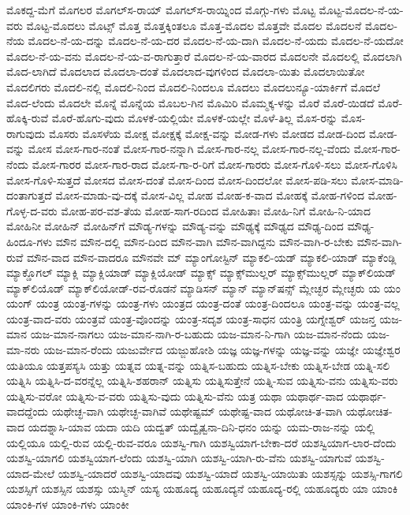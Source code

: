 {ಮೊಕದ್ದ-ಮೆಗೆ
ಮೊಗಲರ
ಮೊಗಲ್‌ಸ-ರಾಯ್
ಮೊಗಲ್‌ಸ-ರಾಯ್ನಿಂದ
ಮೊಗ್ಗು-ಗಳು
ಮೊಟ್ಟ
ಮೊಟ್ಟ-ಮೊದಲ-ನೆ-ಯ-ವರು
ಮೊಟ್ಟ-ಮೊದಲು
ಮೊಟ್ಸ್
ಮೊತ್ತ
ಮೊತ್ತಕ್ಕಿಂತಲೂ
ಮೊತ್ತ-ಮೊದಲ
ಮೊತ್ತವೇ
ಮೊದಲ
ಮೊದಲನೆ
ಮೊದಲ-ನೆಯ
ಮೊದಲ-ನೆ-ಯ-ದನ್ನು
ಮೊದಲ-ನೆ-ಯ-ದರ
ಮೊದಲ-ನೆ-ಯ-ದಾಗಿ
ಮೊದಲ-ನೆ-ಯದು
ಮೊದಲ-ನೆ-ಯದೋ
ಮೊದಲ-ನೆ-ಯ-ವನು
ಮೊದಲ-ನೆ-ಯ-ವ-ರಾಗುತ್ತಾರೆ
ಮೊದಲ-ನೆ-ಯ-ವಾರದ
ಮೊದಲನೇ
ಮೊದಲಲ್ಲಿ
ಮೊದಲಾಗಿ
ಮೊದ-ಲಾಗಿದೆ
ಮೊದಲಾದ
ಮೊದಲಾ-ದಂತೆ
ಮೊದಲಾದ-ವುಗಳಿಂದ
ಮೊದಲಾ-ಯಿತು
ಮೊದಲಾಯಿತೋ
ಮೊದಲಿಗರು
ಮೊದಲಿ-ನಲ್ಲಿ
ಮೊದಲಿ-ನಿಂದ
ಮೊದಲಿ-ನಿಂದಲೂ
ಮೊದಲು
ಮೊದಲುನ್ಯೂ-ಯಾರ್ಕಿಗೆ
ಮೊದಲೆ
ಮೊದ-ಲೆಂದು
ಮೊದಲೇ
ಮೊನ್ನೆ
ಮೊನ್ನೆಯ
ಮೊಬಲ-ಗಿನ
ಮೊಮಿರಿ
ಮೊಮ್ಮಕ್ಕ-ಳನ್ನು
ಮೊರೆ
ಮೊರೆ-ಯಿಡದೆ
ಮೊರೆ-ಹೊಕ್ಕಿ-ರುವೆ
ಮೊರೆ-ಹೊಗು-ವುದು
ಮೊಳಕೆ-ಯಲ್ಲಿಯೇ
ಮೊಳಕೆ-ಯಲ್ಲೇ
ಮೊಳೆ-ತಿಲ್ಲ
ಮೊಸ-ರನ್ನು
ಮೊಸ-ರಾಗುವುದು
ಮೊಸರು
ಮೊಸಳೆಯ
ಮೋಕ್ಷ
ಮೋಕ್ಷಕ್ಕೆ
ಮೋಕ್ಷ-ವನ್ನು
ಮೋಡ-ಗಳು
ಮೋಡದ
ಮೋಡ-ದಿಂದ
ಮೋಡ-ವನ್ನು
ಮೋಸ
ಮೋಸ-ಗಾರ-ನಂತೆ
ಮೋಸ-ಗಾರ-ನನ್ನಾಗಿ
ಮೋಸ-ಗಾರ-ನಲ್ಲ
ಮೋಸ-ಗಾರ-ನಲ್ಲ-ವೆಂದು
ಮೋಸ-ಗಾರ-ನೆಂದು
ಮೋಸ-ಗಾರರ
ಮೋಸ-ಗಾರ-ರಾದ
ಮೋಸ-ಗಾ-ರ-ರಿಗೆ
ಮೋಸ-ಗಾರರು
ಮೋಸ-ಗೊಳಿ-ಸಲು
ಮೋಸ-ಗೊಳಿಸಿ
ಮೋಸ-ಗೊಳಿ-ಸುತ್ತದೆ
ಮೋಸದ
ಮೋಸ-ದಂತೆ
ಮೋಸ-ದಿಂದ
ಮೋಸ-ದಿಂದಲೋ
ಮೋಸ-ಪಡಿ-ಸಲು
ಮೋಸ-ಮಾಡಿ-ದಂತಾಗುತ್ತದೆ
ಮೋಸ-ಮಾಡು-ವು-ದಕ್ಕೆ
ಮೋಸ-ವಿಲ್ಲ
ಮೋಹ
ಮೋಹ-ಕ-ವಾದ
ಮೋಹಕ್ಕೆ
ಮೋಹ-ಗಳಿಂದ
ಮೋಹ-ಗೊಳ್ಳ-ದ-ವರು
ಮೋಹ-ಪರ-ವಶ-ತೆಯ
ಮೋಹ-ಸಾಗ-ರದಿಂದ
ಮೋಹಿತಾಃ
ಮೋಹಿ-ನಿಗೆ
ಮೋಹಿ-ನಿ-ಯಾದ
ಮೋಹಿನೀ
ಮೋಹಿನ್
ಮೋಹಿನ್‌ಗೆ
ಮೌಡ್ಯ-ಗಳನ್ನು
ಮೌಡ್ಯ-ವನ್ನು
ಮೌಢ್ಯಕ್ಕೆ
ಮೌಢ್ಯದ
ಮೌಢ್ಯ-ದಿಂದ
ಮೌಢ್ಯ-ಹಿಂದೂ-ಗಳು
ಮೌನ
ಮೌನ-ದಲ್ಲಿ
ಮೌನ-ದಿಂದ
ಮೌನ-ವಾಗಿ
ಮೌನ-ವಾಗಿದ್ದನು
ಮೌನ-ವಾಗಿ-ರ-ಬೇಕು
ಮೌನ-ವಾಗಿ-ರುವೆ
ಮೌನ-ವಾದ
ಮೌನ-ವಾದರೂ
ಮೌನವೇ
ಮ್
ಮ್ಯಾಂಗೋಸ್ಟಿನ್
ಮ್ಯಾಕಲಿ-ಯಡ್
ಮ್ಯಾಕಲಿ-ಯಾಡ್
ಮ್ಯಾಕೆಂಡ್ಲಿ
ಮ್ಯಾಕ್ಡೊಗಲ್
ಮ್ಯಾಕ್ಲಿ
ಮ್ಯಾಕ್ಲಿಯಾಡ್
ಮ್ಯಾಕ್ಲಿಯೋಡ್
ಮ್ಯಾಕ್ಸ್
ಮ್ಯಾಕ್ಸ್‌ಮುಲ್ಲರ್
ಮ್ಯಾಕ್ಸ್‌ಮುಲ್ಲರ್‌
ಮ್ಯಾಕ್‌ಲಿಯಡ್
ಮ್ಯಾಕ್‌ಲಿಯೊಡ್
ಮ್ಯಾಕ್‌ಲಿಯೋಡ್‌-ರವ-ರೊಡನೆ
ಮ್ಯಾಡಿಸನ್
ಮ್ಯಾನ್
ಮ್ಯಾನ್‌ಷನ್ಸ್
ಮ್ಲೇಚ್ಛರ
ಮ್ಲೇಚ್ಛರು
ಯ
ಯಂ
ಯಂಗ್
ಯಂತ್ರ
ಯಂತ್ರ-ಗಳನ್ನು
ಯಂತ್ರ-ಗಳು
ಯಂತ್ರದ
ಯಂತ್ರ-ದಂತೆ
ಯಂತ್ರ-ದಿಂದಲೂ
ಯಂತ್ರ-ವನ್ನು
ಯಂತ್ರ-ವಲ್ಲ
ಯಂತ್ರ-ವಾದ-ವರು
ಯಂತ್ರವೆ
ಯಂತ್ರ-ವೊಂದನ್ನು
ಯಂತ್ರ-ಸದೃಶ
ಯಂತ್ರ-ಸಾಧನ
ಯಂತ್ರಿ
ಯಗ್ನೇಶ್ವರ್
ಯಜನ್ತ
ಯಜ-ಮಾನ
ಯಜ-ಮಾನ-ನಾಗಲು
ಯಜ-ಮಾನ-ನಾಗಿ-ರ-ಬಹುದು
ಯಜ-ಮಾನ-ನಿ-ಗಾಗಿ
ಯಜ-ಮಾನ-ನೆಂದು
ಯಜ-ಮಾ-ನರು
ಯಜ-ಮಾನ-ರೆಂದು
ಯಜುರ್ವೇದ
ಯಜ್ಜುಹೋಶಿ
ಯಜ್ಞ
ಯಜ್ಞ-ಗಳನ್ನು
ಯಜ್ಞ-ವನ್ನು
ಯಜ್ಞೇ
ಯಜ್ಞೇಶ್ವರ
ಯತಿಯೂ
ಯತ್ತಪಸ್ಯಸಿ
ಯತ್ತು
ಯತ್ನವ
ಯತ್ನ-ವನ್ನು
ಯತ್ನಿಸ-ಬಹುದು
ಯತ್ನಿಸ-ಬೇಕು
ಯತ್ನಿಸ-ಬೇಡ
ಯತ್ನಿ-ಸಲಿ
ಯತ್ನಿಸಿ
ಯತ್ನಿಸಿ-ದ-ವರನ್ನೆಲ್ಲ
ಯತ್ನಿಸಿ-ಶಹರಾನ್
ಯತ್ನಿಸು
ಯತ್ನಿಸುತ್ತೇನೆ
ಯತ್ನಿ-ಸುವ
ಯತ್ನಿಸು-ವನು
ಯತ್ನಿಸು-ವರು
ಯತ್ನಿಸು-ವರೋ
ಯತ್ನಿಸು-ವ-ವರು
ಯತ್ನಿಸು-ವುದು
ಯತ್ನಿಸು-ವೆನು
ಯತ್ರ
ಯಥಾ
ಯಥಾರ್ಥ-ವಾದ
ಯಥಾರ್ಥ-ವಾದದ್ದೆಂದು
ಯಥೇಚ್ಛ-ವಾಗಿ
ಯಥೇಚ್ಛ-ವಾಗಿವೆ
ಯಥೇಷ್ಟಮ್
ಯಥೇಷ್ಟ-ವಾದ
ಯಥೋಚಿ-ತ-ವಾಗಿ
ಯಥೋಚಿತ-ವಾದ
ಯದಶ್ನಾಸಿ-ಯಾವ
ಯದಾ
ಯದಿ
ಯದ್ವತ್
ಯದ್ವೈತ್ವನಾ-ದಿನಿ-ಧನಂ
ಯನ್ನು
ಯಮ-ರಾಜ-ನನ್ನು
ಯಲ್ಲಿ
ಯಲ್ಲಿಯೂ
ಯಲ್ಲಿ-ರುವ
ಯಲ್ಲಿ-ರುವ-ವರೂ
ಯಶಸ್ವಿ-ಗಾಗಿ
ಯಶಸ್ವಿಯಾಗ-ಬೇಕಾ-ದರೆ
ಯಶಸ್ವಿಯಾಗ-ಲಾರ-ದೆಂದು
ಯಶಸ್ವಿ-ಯಾಗಲಿ
ಯಶಸ್ವಿಯಾಗ-ಲೆಂದು
ಯಶಸ್ವಿ-ಯಾಗಿ
ಯಶಸ್ವಿ-ಯಾಗಿ-ರು-ವೆನು
ಯಶಸ್ವಿ-ಯಾಗುವೆ
ಯಶಸ್ವಿ-ಯಾದ-ಮೇಲೆ
ಯಶಸ್ವಿ-ಯಾದರೆ
ಯಶಸ್ವಿ-ಯಾದವು
ಯಶಸ್ವಿ-ಯಾದೆ
ಯಶಸ್ವಿ-ಯಾಯಿತು
ಯಶಸ್ಸನ್ನು
ಯಶಸ್ಸಿ-ಗಾಗಲಿ
ಯಶಸ್ಸಿಗೆ
ಯಶಸ್ಸಿನ
ಯಶಸ್ಸು
ಯಸ್ಮಿನ್
ಯಸ್ಯ
ಯಹೂದ್ಯ
ಯಹೂದ್ಯನೆ
ಯಹೂದ್ಯ-ರಲ್ಲಿ
ಯಹೂದ್ಯರು
ಯಾ
ಯಾಂಕಿ
ಯಾಂಕಿ-ಗಳ
ಯಾಂಕಿ-ಗಳು
ಯಾಂಕೀ
}
